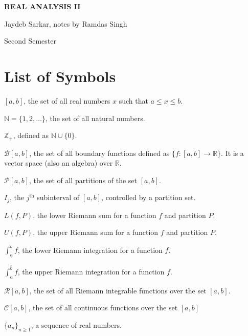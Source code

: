 \documentclass[15pt,a4paper]{book}
\theoremstyle{definition}
\newcommand{\cC}{\mathcal{C}}
\begin{document}
\pagestyle{empty}

\begin{titlepage}
    \begin{center}
    \vspace*{\fill}
    {\Huge \textbf{\MakeUppercase{Real Analysis II}}\par}

    \vspace{0.5cm} %
    {\Large Jaydeb Sarkar, notes by Ramdas Singh\par}

    \vspace{0.5cm} %
    {\large Second Semester\par}
    \vspace*{\fill}
    \end{center}
\end{titlepage}

\clearpage


\chapter*{List of Symbols}
\begin{notationlist}
    \item $[a,b]$, the set of all real numbers $x$ such that $a \leq x \leq b$.
    \item $\mathbb{N} = \{1,2,\ldots\}$, the set of all natural numbers.
    \item $\mathbb{Z}_{+}$, defined as $\mathbb{N} \cup \{0\}$.
    \item $\mathcal{B}[a,b]$, the set of all boundary functions defined as $\{f:[a,b] \to \mathbb{R}\}$. It is a vector space (also an algebra) over $\mathbb{R}$.
    \item $\mathcal{P}[a,b]$, the set of all partitions of the set $[a,b]$.
    \item $I_{j}$, the $j^{\text{th}}$ subinterval of $[a,b]$, controlled by a partition set.
    \item $L(f,P)$, the lower Riemann sum for a function $f$ and partition $P$.
    \item $U(f,P)$, the upper Riemann sum for a function $f$ and partition $P$.
    \item $\int_{\underline{a}}^{b} f$, the lower Riemann integration for a function $f$.
    \item $\int_{a}^{\overline{b}} f$, the upper Riemann integration for a function $f$.
    \item $\mathcal{R}[a,b]$, the set of all Riemann integrable functions over the set $[a,b]$.
    \item $\cC[a,b]$, the set of all continuous functions over the set $[a,b]$
    \item $\{a_{n}\}_{n \geq 1}$, a sequence of real numbers.
\end{notationlist}
\end{document}
